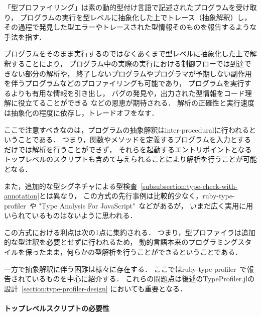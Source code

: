 「型プロファイリング」は素の動的型付け言語で記述されたプログラムを受け取り，
プログラムの実行を型レベルに抽象化した上でトレース（抽象解釈）し，
その過程で発見した型エラーやトレースされた型情報そのものを報告するような手法を指す．

プログラムをそのまま実行するのではなくあくまで型レベルに抽象化した上で解釈することにより，
プログラム中の実際の実行における制御フローでは到達できない部分の解析や，
終了しないプログラムやプログラマが予期しない副作用を伴うプログラムなどのプロファイリングも可能であり，
プログラムを実行するよりも有用な情報を引き出し，
バグの発見や，出力された型情報をコード理解に役立てることができる
などの恩恵が期待される\footnotemark[\value{footnote}]．
解析の正確性と実行速度は抽象化の程度に依存し，トレードオフをなす．

ここで注意すべきなのは，プログラムの抽象解釈はinter-proceduralに行われるということである．
つまり，関数やメソッドを定義するプログラムを入力とするだけでは解析を行うことができず，
それらを起動するエントリポイントとなるトップレベルのスクリプトも含めて与えられることにより解析を行うことが可能となる．

また，追加的な型シグネチャによる型検査~\ref{subsubsection:type-check-with-annotation}とは異なり，
この方式の先行事例は比較的少なく，ruby-type-profiler~\cite{ruby-type-profiler}や
"Type Analysis For JavaScript"~\cite{type-analysis-for-javascript}などがあるが，
いまだ広く実用に用いられているものはないように思われる．\

この方式における利点は次の1点に集約される．
つまり，型プロファイラは追加的な型注釈を必要とせずに行われるため，
動的言語本来のプログラミングスタイルを保ったまま，何らかの型解析を行うことができるということである．

一方で抽象解釈に伴う困難は様々に存在する．
ここではruby-type-profiler~\cite{ruby-progress-report, ruby-type-profiler}で報告されているものを中心に紹介する．
これらの問題点は後述のTypeProfiler.jlの設計~\ref{section:type-profiler-design}
においても重要となる．

\paragraph{トップレベルスクリプトの必要性}


